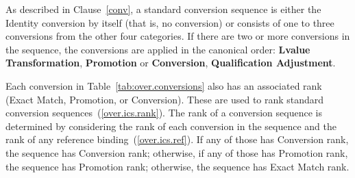 \pnum
\begin{note}
As described in Clause~\ref{conv},
a standard conversion sequence is either the Identity conversion
by itself (that is, no conversion) or consists of one to three
conversions from the other
four categories.
If there are two or more conversions in the sequence, the
conversions are applied in the canonical order:
\textbf{Lvalue Transformation},
\textbf{Promotion}
or
\textbf{Conversion},
\textbf{Qualification Adjustment}.
\end{note}

\pnum
{}%
Each conversion in Table~\ref{tab:over.conversions}
also has an associated rank (Exact
Match, Promotion, or Conversion).
These are used
to rank standard conversion sequences~(\ref{over.ics.rank}).
The rank of a conversion sequence is determined by considering the
rank of each conversion in the sequence and the rank of any reference
binding~(\ref{over.ics.ref}).
If any of those has Conversion rank, the
sequence has Conversion rank; otherwise, if any of those has Promotion rank,
the sequence has Promotion rank; otherwise, the sequence has Exact
Match rank.

